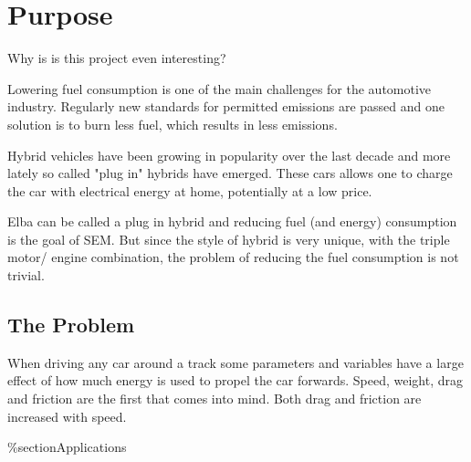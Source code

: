 \chapter{Purpose}

Why is is this project even interesting?

Lowering fuel consumption is one of the main challenges for the automotive 
industry. Regularly new standards for permitted emissions are passed and  
one solution is to burn less fuel, which results in less emissions.

Hybrid vehicles have been growing in popularity over the last decade and 
more lately so called "plug in" hybrids have emerged. These cars allows one 
to charge the car with electrical energy at home, potentially at a low price.

Elba can be called a plug in hybrid and reducing fuel (and energy) consumption is the goal of SEM. But since the style of hybrid is very unique, with the triple motor/ engine combination, the problem of reducing the fuel consumption is not trivial. 

\section{The Problem}
When driving any car around a track some parameters and variables have a large effect of how much energy is used to propel the car forwards. Speed, weight, drag and friction are the first that comes into mind. Both drag and friction are increased with speed.

\%section{Applications}
